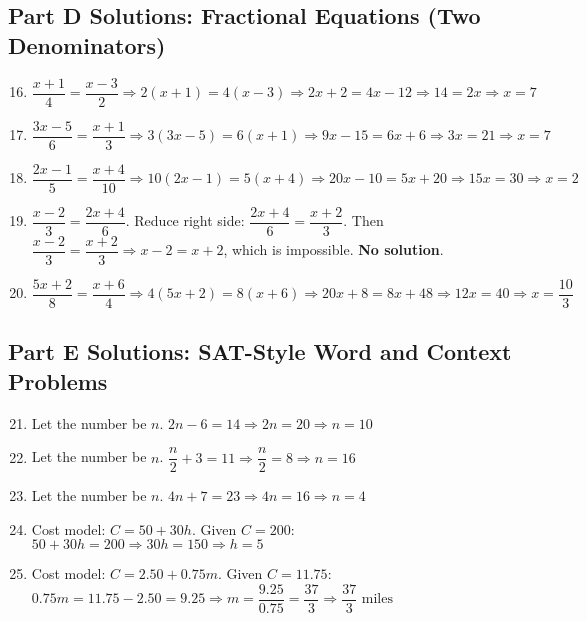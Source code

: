 \documentclass[14pt]{extarticle}
\begin{document}
\subsection*{Part D Solutions: Fractional Equations (Two Denominators)}
\begin{enumerate}
    \setcounter{enumi}{15}
    \item \(\dfrac{x + 1}{4} = \dfrac{x - 3}{2} \Rightarrow 2(x + 1) = 4(x - 3) \Rightarrow 2x + 2 = 4x - 12 \Rightarrow 14 = 2x \Rightarrow x = \boxed{7}\)
    \item \(\dfrac{3x - 5}{6} = \dfrac{x + 1}{3} \Rightarrow 3(3x - 5) = 6(x + 1) \Rightarrow 9x - 15 = 6x + 6 \Rightarrow 3x = 21 \Rightarrow x = \boxed{7}\)
    \item \(\dfrac{2x - 1}{5} = \dfrac{x + 4}{10} \Rightarrow 10(2x - 1) = 5(x + 4) \Rightarrow 20x - 10 = 5x + 20 \Rightarrow 15x = 30 \Rightarrow x = \boxed{2}\)
    \item \(\dfrac{x - 2}{3} = \dfrac{2x + 4}{6}\). Reduce right side: \(\dfrac{2x + 4}{6} = \dfrac{x + 2}{3}\). Then \(\dfrac{x - 2}{3} = \dfrac{x + 2}{3} \Rightarrow x - 2 = x + 2\), which is impossible. \textbf{No solution}.
    \item \(\dfrac{5x + 2}{8} = \dfrac{x + 6}{4} \Rightarrow 4(5x + 2) = 8(x + 6) \Rightarrow 20x + 8 = 8x + 48 \Rightarrow 12x = 40 \Rightarrow x = \boxed{\dfrac{10}{3}}\)
\end{enumerate}

\subsection*{Part E Solutions: SAT-Style Word and Context Problems}
\begin{enumerate}
    \setcounter{enumi}{20}
    \item Let the number be \(n\). \(2n - 6 = 14 \Rightarrow 2n = 20 \Rightarrow n = \boxed{10}\)
    \item Let the number be \(n\). \(\dfrac{n}{2} + 3 = 11 \Rightarrow \dfrac{n}{2} = 8 \Rightarrow n = \boxed{16}\)
    \item Let the number be \(n\). \(4n + 7 = 23 \Rightarrow 4n = 16 \Rightarrow n = \boxed{4}\)
    \item Cost model: \(C = 50 + 30h\). Given \(C = 200\): \(50 + 30h = 200 \Rightarrow 30h = 150 \Rightarrow h = \boxed{5}\)
    \item Cost model: \(C = 2.50 + 0.75m\). Given \(C = 11.75\): \(0.75m = 11.75 - 2.50 = 9.25 \Rightarrow m = \dfrac{9.25}{0.75} = \dfrac{37}{3} \Rightarrow \boxed{\dfrac{37}{3}\text{ miles}}\)
\end{enumerate}
\end{document}
